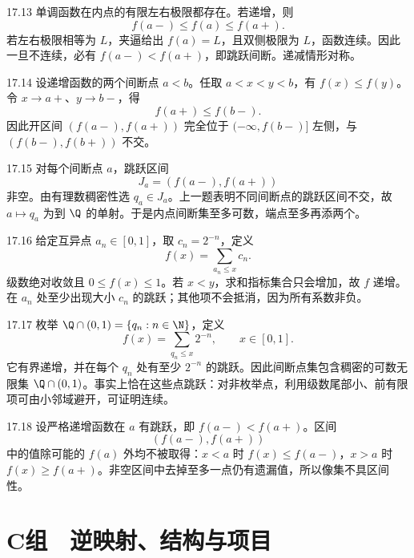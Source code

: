 \begin{solution}{17.13}
单调函数在内点的有限左右极限都存在。若递增，则
\[
 f(a-)\le f(a)\le f(a+).
\]
若左右极限相等为 \(L\)，夹逼给出 \(f(a)=L\)，且双侧极限为 \(L\)，函数连续。因此一旦不连续，必有 \(f(a-)<f(a+)\)，即跳跃间断。递减情形对称。
\end{solution}

\begin{solution}{17.14}
设递增函数的两个间断点 \(a<b\)。任取 \(a<x<y<b\)，有 \(f(x)\le f(y)\)。令 \(x\to a+\)、\(y\to b-\)，得
\[
 f(a+)\le f(b-).
\]
因此开区间 \((f(a-),f(a+))\) 完全位于 \((-\infty,f(b-)]\) 左侧，与 \((f(b-),f(b+))\) 不交。
\end{solution}

\begin{solution}{17.15}
对每个间断点 \(a\)，跳跃区间
\[
 J_a=(f(a-),f(a+))
\]
非空。由有理数稠密性选 \(q_a\in J_a\)。上一题表明不同间断点的跳跃区间不交，故 \(a\mapsto q_a\) 为到 \(\Q\) 的单射。于是内点间断集至多可数，端点至多再添两个。
\end{solution}

\begin{solution}{17.16}
给定互异点 \(a_n\in[0,1]\)，取 \(c_n=2^{-n}\)，定义
\[
 f(x)=\sum_{a_n\le x}c_n.
\]
级数绝对收敛且 \(0\le f(x)\le1\)。若 \(x<y\)，求和指标集合只会增加，故 \(f\) 递增。在 \(a_n\) 处至少出现大小 \(c_n\) 的跳跃；其他项不会抵消，因为所有系数非负。
\end{solution}

\begin{solution}{17.17}
枚举 \(\Q\cap(0,1)=\{q_n:n\in\N\}\)，定义
\[
 f(x)=\sum_{q_n\le x}2^{-n},\qquad x\in[0,1].
\]
它有界递增，并在每个 \(q_n\) 处有至少 \(2^{-n}\) 的跳跃。因此间断点集包含稠密的可数无限集 \(\Q\cap(0,1)\)。事实上恰在这些点跳跃：对非枚举点，利用级数尾部小、前有限项可由小邻域避开，可证明连续。
\end{solution}

\begin{solution}{17.18}
设严格递增函数在 \(a\) 有跳跃，即 \(f(a-)<f(a+)\)。区间
\[
 (f(a-),f(a+))
\]
中的值除可能的 \(f(a)\) 外均不被取得：\(x<a\) 时 \(f(x)\le f(a-)\)，\(x>a\) 时 \(f(x)\ge f(a+)\)。非空区间中去掉至多一点仍有遗漏值，所以像集不具区间性。
\end{solution}

\section*{C组　逆映射、结构与项目}


